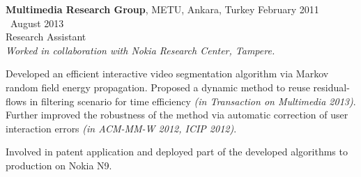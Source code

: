     \textbf{Multimedia Research Group}, METU, Ankara, Turkey \hfill February 2011 \textendash ~August 2013\vspace{0.5mm}\\\vspace{0mm}
	\hspace{-1mm}Research Assistant  \hfill \vspace{0.5mm}\\\vspace{0mm}
	\hspace{-1mm}\emph{Worked in collaboration with Nokia Research Center, Tampere.} \\ \vspace{-5mm}

	Developed an efficient interactive video segmentation algorithm via Markov random field energy propagation. Proposed a dynamic method to reuse residual-flows in filtering scenario for time efficiency \emph{(in Transaction on Multimedia 2013)}. Further improved the robustness of the method via automatic correction of user interaction errors \emph{(in ACM-MM-W 2012, ICIP 2012)}.
	
	Involved in patent application and deployed part of the developed algorithms to production on Nokia N9.
